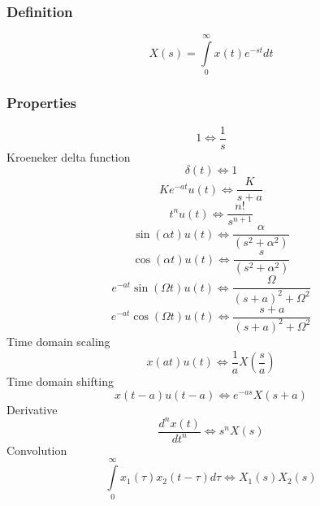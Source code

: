 \documentclass{article}
\begin{document}
		\subsubsection{Definition}
			\begin{equation}
				X(s) = \int\limits_0^\infty {x(t)e^{ - st} dt}
			\end{equation}
		\subsubsection{Properties}
			\begin{equation}
				1 \Leftrightarrow \frac{1}{{s}}
			\end{equation}
			Kroeneker delta function
			\begin{equation}
				\delta (t) \Leftrightarrow 1
			\end{equation}
			\begin{equation}
				Ke^{ - at} u(t) \Leftrightarrow \frac{K}{{s + a}}			
			\end{equation}
			\begin{equation}
				t^n u(t) \Leftrightarrow \frac{{n!}}{{s^{n + 1} }}
			\end{equation}
			\begin{equation}
				\sin (\alpha t)u(t) \Leftrightarrow \frac{\alpha }{{(s^2 + \alpha ^2 )}}
			\end{equation}
			\begin{equation}
				\cos (\alpha t)u(t) \Leftrightarrow \frac{s}{{(s^2 + \alpha ^2 )}}
			\end{equation}
			\begin{equation}
			e^{ - at} \sin (\Omega t)u(t) \Leftrightarrow \frac{\Omega }{{(s + a)^2 + \Omega ^2 }}
			\end{equation}
			\begin{equation}
				e^{ - at} \cos (\Omega t)u(t) \Leftrightarrow \frac{{s + a}}{{(s + a)^2 + \Omega ^2 }}
			\end{equation}
			Time domain scaling
			\begin{equation}
				x(at)u(t) \Leftrightarrow \frac{1}{a}X\left( {\frac{s}{a}} \right)
			\end{equation}
			Time domain shifting 
			\begin{equation}
				x(t - a)u(t - a) \Leftrightarrow e^{ - as} X(s + a)
			\end{equation}
			Derivative
			\begin{equation}
				\frac{{d^n x(t)}}{{dt^n }} \Leftrightarrow s^n X(s)			
			\end{equation}
			Convolution
			\begin{equation}
			\int\limits_0^\infty {x_1 (\tau )x_2 (t - \tau )d\tau } \Leftrightarrow X_1 (s)X_2 (s)
			\end{equation}
\end{document}
